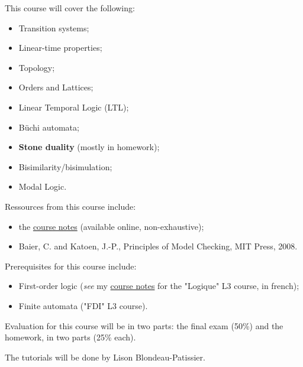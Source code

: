 \documentclass[./main]{subfiles}
\begin{document}
  This course will cover the following:
  \begin{itemize}
    \item Transition systems;
    \item Linear-time properties;
    \item Topology;
    \item Orders and Lattices;
    \item Linear Temporal Logic (LTL);
    \item Büchi automata;
    \item \textbf{Stone duality} (mostly in homework);
    \item Bisimilarity/bisimulation;
    \item Modal Logic.
  \end{itemize}

  Ressources from this course include:
  \begin{itemize}
    \item the \href{https://perso.ens-lyon.fr/colin.riba/teaching/sv/notes.pdf}{course notes} (available online, non-exhaustive);
    \item Baier, C. and Katoen, J.-P., Principles of Model Checking, MIT Press, 2008.
  \end{itemize}

  Prerequisites for this course include:
  \begin{itemize}
    \item First-order logic (\textit{see} my \href{https://hugos29.dev/data/ens1/logique.pdf}{course notes} for the "Logique" L3 course, in french);
    \item Finite automata ("FDI" L3 course).
  \end{itemize}

  Evaluation for this course will be in two parts: the final exam (50\:\%) and the homework, in two parts (25\:\% each).
  
  The tutorials will be done by Lison Blondeau-Patissier.
\end{document}
